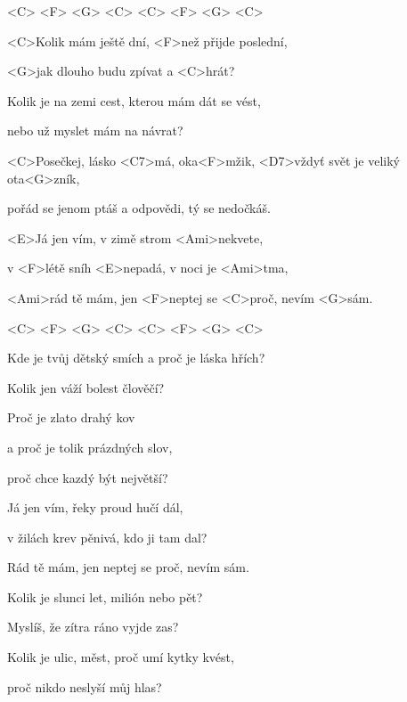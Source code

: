 


<C> <F> <G> <C> <C> <F> <G> <C>

\zs
<C>Kolik mám ještě dní, <F>než přijde poslední,

<G>jak dlouho budu zpívat a <C>hrát?

Kolik je na zemi cest, kterou mám dát se vést,

nebo už myslet mám na návrat?
\ks

\zr
<C>Posečkej, lásko <C7>má, oka<F>mžik,
<D7>vždyť svět je veliký ota<G>zník,

pořád se jenom ptáš a odpovědi, tý se nedočkáš.
\kr

\zr
<E>Já jen vím, v zimě strom <Ami>nekvete,

v <F>létě sníh <E>nepadá, v noci je <Ami>tma,

<Ami>rád tě mám,
jen <F>neptej se <C>proč, nevím <G>sám.
\kr

<C> <F> <G> <C> <C> <F> <G> <C>

\zs
Kde je tvůj dětský smích a proč je láska hřích?

Kolik jen váží bolest člověčí?

Proč je zlato drahý kov

a proč je tolik prázdných slov,

proč chce kazdý být největší?
\ks

\zr \kr

\zr
Já jen vím, řeky proud hučí dál,

v žilách krev pěnivá, kdo ji tam dal?

Rád tě mám, jen neptej se proč, nevím sám.
\kr

\zs
Kolik je slunci let, milión nebo pět?

Myslíš, že zítra ráno vyjde zas?

Kolik je ulic, měst, proč umí kytky kvést,

proč nikdo neslyší můj hlas?
\ks

\kp





